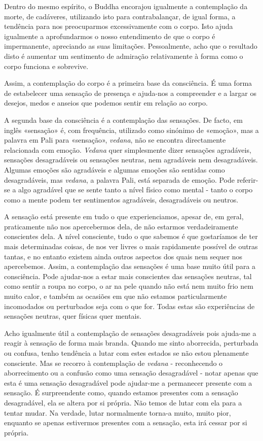 Dentro do mesmo espírito, o Buddha encorajou igualmente a contemplação
da morte, de cadáveres, utilizando isto para contrabalançar, de igual
forma, a tendência para nos preocuparmos excessivamente com o corpo.
Isto ajuda igualmente a aprofundarmos o nosso entendimento de que o
corpo é impermanente, apreciando as suas limitações. Pessoalmente, acho
que o resultado disto é aumentar um sentimento de admiração
relativamente à forma como o corpo funciona e sobrevive.

Assim, a contemplação do corpo é a primeira base da consciência. É uma
forma de estabelecer uma sensação de presença e ajuda-nos a compreender
e a largar os desejos, medos e anseios que podemos sentir em relação ao
corpo.

A segunda base da consciência é a contemplação das sensações. De facto,
em inglês «sensação» é, com frequência, utilizado como sinónimo de
«emoção», mas a palavra em Pali para «sensação», \emph{vedana}, não se
encontra directamente relacionada com emoção. \emph{Vedana} quer
simplesmente dizer sensações agradáveis, sensações desagradáveis ou
sensações neutras, nem agradáveis nem desagradáveis. Algumas emoções são
agradáveis e algumas emoções são sentidas como desagradáveis, mas
\emph{vedana}, a palavra Pali, está separada de emoção. Pode referir-se
a algo agradável que se sente tanto a nível físico como mental - tanto o
corpo como a mente podem ter sentimentos agradáveis, desagradáveis ou
neutros.

A sensação está presente em tudo o que experienciamos, apesar de, em
geral, praticamente não nos apercebermos dela, de não estarmos
verdadeiramente conscientes dela. A nível consciente, tudo o que sabemos
é que gostaríamos de ter mais determinadas coisas, de nos ver livres o
mais rapidamente possível de outras tantas, e no entanto existem ainda
outros aspectos dos quais nem sequer nos apercebemos. Assim, a
contemplação das sensações é uma base muito útil para a consciência.
Pode ajudar-nos a estar mais conscientes das sensações neutras, tal como
sentir a roupa no corpo, o ar na pele quando não está nem muito frio nem
muito calor, e também as ocasiões em que não estamos particularmente
incomodados ou perturbados seja com o que for. Todas estas são
experiências de sensações neutras, quer físicas quer mentais.

Acho igualmente útil a contemplação de sensações desagradáveis pois
ajuda-me a reagir à sensação de forma mais branda. Quando me sinto
aborrecida, perturbada ou confusa, tenho tendência a lutar com estes
estados se não estou plenamente consciente. Mas se recorro à
contemplação de \emph{vedana} - reconhecendo o aborrecimento ou a
confusão como uma sensação desagradável - notar apenas que esta é uma
sensação desagradável pode ajudar-me a permanecer presente com a
sensação. É surpreendente como, quando estamos presentes com a sensação
desagradável, ela se altera por si própria. Não temos de lutar com ela
para a tentar mudar. Na verdade, lutar normalmente torna-a muito, muito
pior, enquanto se apenas estivermos presentes com a sensação, esta irá
cessar por si própria.

